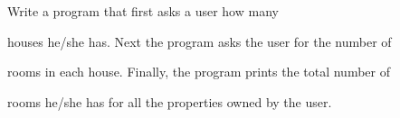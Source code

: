  Write a program that first asks a user how many

houses he/she has. Next the program asks the user for the number of

rooms in each house. Finally, the program prints the total number of

rooms he/she has for all the properties owned by the user.

